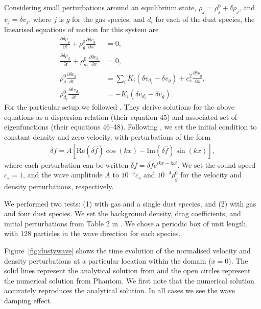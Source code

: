 \documentclass[fleqn,usenatbib]{mnras}
\begin{document}
Considering small perturbations around an equilibrium state, \(\rho_j = \rho_j^0
+ \delta \rho_j\), and \(v_j = \delta v_j\), where \(j\) is \(g\) for the gas
species, and \(d_i\) for each of the dust species, the linearised equations of
motion for this system are
%
\begin{align}
   \frac{\partial \delta \rho_g}{\partial t}
      + \rho_g^0 \frac{\partial \delta v_g}{\partial x} &= 0, \\
   \frac{\partial \delta \rho_{d_i}}{\partial t}
      + \rho_{d_i}^0 \frac{\partial \delta v_{d_i}}{\partial x} &= 0, \\
   \rho_g^0 \frac{\partial \delta v_g}{\partial t}
      &= \sum_i K_i \left(\delta v_{d_i} - \delta v_g \right)
         + c_s^2 \frac{\partial \delta \rho_g}{\partial x}, \\
   \rho_{d_i}^0 \frac{\partial \delta v_{d_i}}{\partial t}
      &= - K_i \left(\delta v_{d_i} - \delta v_{g}\right).
\end{align}
%
For the particular setup we followed \citet{Benitez-Llambay2019ApJS..241...25B}.
They derive solutions for the above equations as a dispersion relation (their
equation 45) and associated set of eigenfunctions (their equations 46--48).
Following \citet{Benitez-Llambay2019ApJS..241...25B}, we set the initial
condition to constant density and zero velocity, with perturbations of the form
%
\begin{align}
   \delta f = A \left[\mathrm{Re} \left(\delta \hat{f} \right) \cos(kx)
      - \mathrm{Im} \left(\delta \hat{f} \right) \sin(kx) \right],
\end{align}
%
where each perturbation can be written \(\delta f = \delta \hat{f} e^{ikx -
i\omega t}\). We set the sound speed \(c_s = 1\), and the wave amplitude \(A\)
to \(10^{-4} c_s\) and \(10^{-4} \rho_g^0\) for the velocity and density
perturbations, respectively.

We performed two tests: (1) with gas and a single dust species, and (2) with gas
and four dust species. We set the background density, drag coefficients, and
initial perturbations from Table 2 in
\citet{Benitez-Llambay2019ApJS..241...25B}. We chose a periodic box of unit
length, with 128 particles in the wave direction for each species.

Figure~\ref{fig:dustywave} shows the time evolution of the normalised velocity
and density perturbations at a particular location within the domain (\(x=0\)).
The solid lines represent the analytical solution from
\citet{Benitez-Llambay2019ApJS..241...25B} and the open circles represent the
numerical solution from Phantom. We first note that the numerical solution
accurately reproduces the analytical solution. In all cases we see the wave
damping effect.
\end{document}
